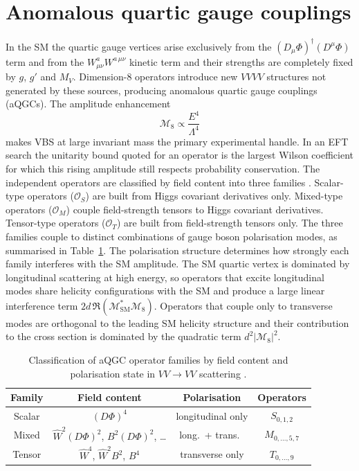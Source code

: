 \section{Anomalous quartic gauge couplings}

In the SM the quartic gauge vertices arise exclusively from the $(D_\mu\Phi)^\dagger(D^\mu\Phi)$ term and from the $W_{\mu\nu}^aW^{a\,\mu\nu}$ kinetic term and their strengths are completely fixed by $g$, $g'$ and $M_V$. Dimension-8 operators introduce new $VVVV$ structures not generated by these sources, producing anomalous quartic gauge couplings (aQGCs). The amplitude enhancement
\begin{equation}
\mathcal{M}_{8}\propto \frac{E^{4}}{\Lambda^{4}}
\end{equation}
makes VBS at large invariant mass the primary experimental handle. In an EFT search the unitarity bound quoted for an operator is the largest Wilson coefficient for which this rising amplitude still respects probability conservation. The independent operators are classified by field content into three families \cite{Eboli_2016}. Scalar-type operators ($\mathcal{O}_{S}$) are built from Higgs covariant derivatives only. Mixed-type operators ($\mathcal{O}_{M}$) couple field-strength tensors to Higgs covariant derivatives. Tensor-type operators ($\mathcal{O}_{T}$) are built from field-strength tensors only. The three families couple to distinct combinations of gauge boson polarisation modes, as summarised in Table~\ref{tab:aqgc_families}. The polarisation structure determines how strongly each family interferes with the SM amplitude. The SM quartic vertex is dominated by longitudinal scattering at high energy, so operators that excite longitudinal modes share helicity configurations with the SM and produce a large linear interference term $2d\,\Re(\mathcal{M}_{\mathrm{SM}}^{*}\mathcal{M}_{8})$. Operators that couple only to transverse modes are orthogonal to the leading SM helicity structure and their contribution to the cross section is dominated by the quadratic term $d^{2}|\mathcal{M}_{8}|^{2}$.

\begin{table}[htbp]
  \centering
  \caption{Classification of aQGC operator families by field content and polarisation state in $VV\to VV$ scattering \cite{Eboli_2016}. }
  \label{tab:aqgc_families}
  \begin{tabular}{|c|c|c|c|}
    \hline
    \textbf{Family} & \textbf{Field content} & \textbf{Polarisation} & \textbf{Operators} \\
    \hline
    Scalar & $(D\Phi)^4$                                  & longitudinal only & $S_{0,1,2}$ \\
    Mixed  & $\hat{W}^2(D\Phi)^2$, $B^2(D\Phi)^2$, \ldots  & long.\ + trans.\  & $M_{0,\ldots,5,7}$ \\
    Tensor & $\hat{W}^4$, $\hat{W}^2 B^2$, $B^4$           & transverse only   & $T_{0,\ldots,9}$ \\
    \hline
  \end{tabular}
\end{table}

